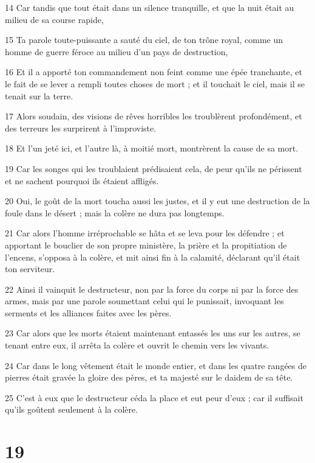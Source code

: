 \par 14 Car tandis que tout était dans un silence tranquille, et que la nuit était au milieu de sa course rapide,
\par 15 Ta parole toute-puissante a sauté du ciel, de ton trône royal, comme un homme de guerre féroce au milieu d'un pays de destruction,
\par 16 Et il a apporté ton commandement non feint comme une épée tranchante, et le fait de se lever a rempli toutes choses de mort ; et il touchait le ciel, mais il se tenait sur la terre.
\par 17 Alors soudain, des visions de rêves horribles les troublèrent profondément, et des terreurs les surprirent à l'improviste.
\par 18 Et l'un jeté ici, et l'autre là, à moitié mort, montrèrent la cause de sa mort.
\par 19 Car les songes qui les troublaient prédisaient cela, de peur qu'ils ne périssent et ne sachent pourquoi ils étaient affligés.
\par 20 Oui, le goût de la mort toucha aussi les justes, et il y eut une destruction de la foule dans le désert ; mais la colère ne dura pas longtemps.
\par 21 Car alors l'homme irréprochable se hâta et se leva pour les défendre ; et apportant le bouclier de son propre ministère, la prière et la propitiation de l'encens, s'opposa à la colère, et mit ainsi fin à la calamité, déclarant qu'il était ton serviteur.
\par 22 Ainsi il vainquit le destructeur, non par la force du corps ni par la force des armes, mais par une parole soumettant celui qui le punissait, invoquant les serments et les alliances faites avec les pères.
\par 23 Car alors que les morts étaient maintenant entassés les uns sur les autres, se tenant entre eux, il arrêta la colère et ouvrit le chemin vers les vivants.
\par 24 Car dans le long vêtement était le monde entier, et dans les quatre rangées de pierres était gravée la gloire des pères, et ta majesté sur le daidem de sa tête.
\par 25 C'est à eux que le destructeur céda la place et eut peur d'eux ; car il suffisait qu'ils goûtent seulement à la colère.

\chapter{19}

